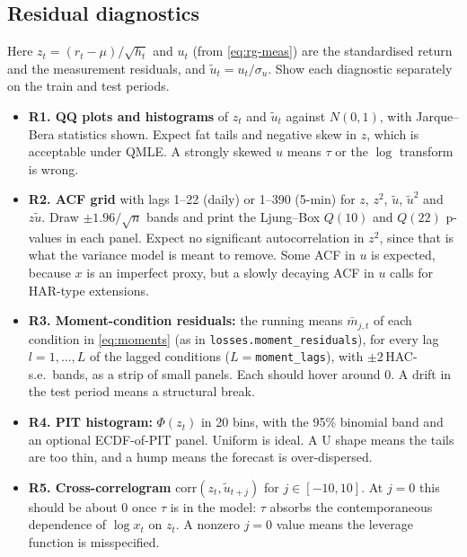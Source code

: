 \documentclass[11pt]{article}
\begin{document}
\subsection{Residual diagnostics}\label{sec:figs-resid}
Here $z_t=(r_t-\mu)/\sqrt{h_t}$ and $u_t$ (from \eqref{eq:rg-meas}) are the standardised return and the
measurement residuals, and $\tilde u_t=u_t/\sigma_u$. Show each diagnostic separately on the train and test periods.
\begin{itemize}
\item \textbf{R1. QQ plots and histograms} of $z_t$ and $\tilde u_t$ against $N(0,1)$, with
Jarque--Bera statistics shown. Expect fat tails and negative skew in $z$, which is acceptable
under QMLE. A strongly skewed $u$ means $\tau$ or the $\log$ transform is wrong.
\item \textbf{R2. ACF grid} with lags 1--22 (daily) or 1--390 (5-min) for $z$, $z^2$, $\tilde u$,
$\tilde u^2$ and $z\tilde u$. Draw $\pm1.96/\sqrt n$ bands and print the Ljung--Box $Q(10)$ and $Q(22)$ p-values in each panel.
Expect no significant autocorrelation in $z^2$, since that is what the variance model is meant to remove.
Some ACF in $u$ is expected, because $x$ is an imperfect proxy, but a slowly decaying ACF in $u$ calls for HAR-type extensions.
\item \textbf{R3. Moment-condition residuals:} the running means
$\bar m_{j,t}$ of each condition in \eqref{eq:moments} (as in \texttt{losses.moment\_residuals}),
for every lag $l=1,\dots,L$ of the lagged conditions ($L=$\texttt{moment\_lags}),
with $\pm2$\,HAC-s.e.\ bands, as a strip of small panels. Each should hover around 0. A drift in
the test period means a structural break.
\item \textbf{R4. PIT histogram:} $\Phi(z_t)$ in 20 bins, with the 95\% binomial band and an
optional ECDF-of-PIT panel. Uniform is ideal. A U shape means the tails are too thin, and a hump means the forecast is over-dispersed.
\item \textbf{R5. Cross-correlogram} $\mathrm{corr}(z_t,\tilde u_{t+j})$ for $j\in[-10,10]$. At $j=0$
this should be about 0 once $\tau$ is in the model: $\tau$ absorbs the contemporaneous dependence of
$\log x_t$ on $z_t$. A nonzero $j=0$ value means the leverage function is misspecified.
\end{itemize}
\end{document}

